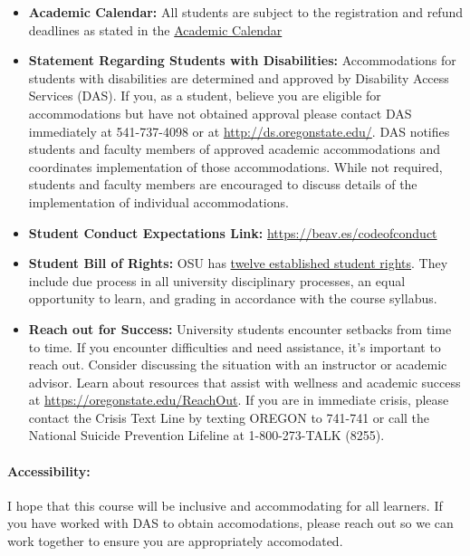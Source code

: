 \documentclass[11pt, a4paper]{article}
\begin{document}
\begin{itemize}
\item[] \textbf{Academic Calendar:} All students are subject to the 
registration and refund deadlines as stated in the 
\href{https://registrar.oregonstate.edu/osu-academic-calendar}{Academic Calendar}

\item[] \textbf{Statement Regarding Students with Disabilities:} 
Accommodations for students with disabilities are determined and approved 
by Disability Access Services (DAS). If you, as a student, believe you are 
eligible for accommodations but have not obtained approval please contact 
DAS immediately at 541-737-4098 or at \url{http://ds.oregonstate.edu/}. 
DAS notifies students and faculty members of approved academic accommodations 
and coordinates implementation of those accommodations. While not required, 
students and faculty members are encouraged to discuss details of the 
implementation of individual accommodations.

\item[] \textbf{Student Conduct Expectations Link:} 
\url{https://beav.es/codeofconduct}

\item[] \textbf{Student Bill of Rights:} 
OSU has 
\href{https://asosu.oregonstate.edu/advocacy/rights}{twelve established student rights}. 
They include due process in all 
university disciplinary processes, an equal opportunity to learn, and grading 
in accordance with the course syllabus. 

\item[] \textbf{Reach out for Success:} 
University students encounter setbacks from time to time. If you encounter
 difficulties and need assistance, it’s important to reach out. Consider 
discussing the situation with an instructor or academic advisor. Learn about 
resources that assist with wellness and academic success at
\url{https://oregonstate.edu/ReachOut}. 
If you are in immediate crisis, please contact the Crisis Text Line by texting 
OREGON to 741-741 or call the National Suicide Prevention Lifeline at 
1-800-273-TALK (8255). 
\end{itemize}


\paragraph{Accessibility:} I hope that this course will be inclusive and
accommodating for all learners. If you have worked with DAS to obtain 
accomodations, please reach out so we can work together to ensure you 
are appropriately accomodated. 
\end{document}
